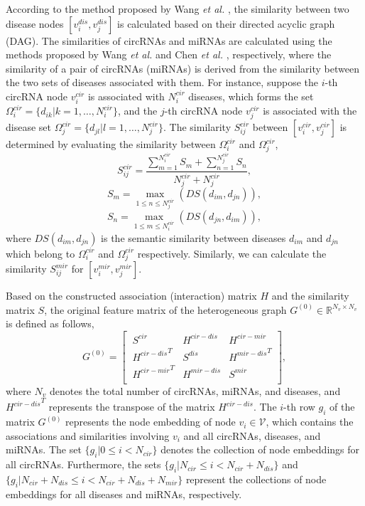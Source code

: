 \documentclass[journal,twoside,web]{ieeecolor}
\begin{document}
According to the method proposed by Wang {\it et al.} \cite{wang2010inferring}, the similarity between two disease nodes $[v_i^{dis},v_j^{dis}]$ is calculated based on their directed acyclic graph (DAG). The similarities of circRNAs and miRNAs are calculated using the methods proposed by Wang {\it et al.} \cite{wang2010inferring} and Chen {\it et al.} \cite{chen2015constructing}, respectively, where the similarity of a pair of circRNAs (miRNAs) is derived from the similarity between the two sets of diseases associated with them. For instance, suppose the $i$-th circRNA node $v_i^{cir}$ is associated with $N^{cir}_i$ diseases, which forms the set $\Omega_i^{cir} = \{d_{ik} | k = 1, \ldots, N^{cir}_i\}$, and the $j$-th circRNA node $v_j^{cir}$ is associated with the disease set $\Omega_j^{cir} = \{d_{jl} | l = 1, \ldots, N^{cir}_j\}$. The similarity $S_{ij}^{cir}$ between $[v_i^{cir},v_j^{cir}]$ is determined by evaluating the similarity between $\Omega_i^{cir}$ and $\Omega_j^{cir}$, 
\begin{equation}
S_{ij}^{cir} = \frac{{\sum_{m=1}^{N^{cir}_i}S_m}+{\sum_{n=1}^{N^{cir}_j}}S_n }{N^{cir}_j + N^{cir}_j},
\end{equation}
\begin{equation}
    S_m = \underset{1\leqslant n\leqslant N^{cir}_j}{\max}(DS(d_{im}, d_{jn})),
\end{equation}
\begin{equation}
    S_n = \underset{1\leqslant m\leqslant N^{cir}_i}{\max}(DS(d_{jn}, d_{im})),
\end{equation}
where $DS(d_{im}, d_{jn})$ is the semantic similarity between diseases $d_{im}$ and $d_{jn}$ which belong to $\Omega_i^{cir}$ and $\Omega_j^{cir}$ respectively. %
Similarly, we can calculate the similarity $S_{ij}^{mir}$ for $[v_i^{mir},v_j^{mir}]$.

Based on the constructed association (interaction) matrix $H$ and the similarity matrix $S$, the original feature matrix of the heterogeneous graph $G^{(0)} \in \mathbb{R}^{N_v\times N_v}$ is defined as follows,
\begin{equation}
G^{(0)} = \left[\ \begin{array}{lll}
S^{cir} & H^{cir-dis} & H^{cir-mir}\\
{H^{cir-dis}}^T & S^{dis} & {H^{mir-dis}}^T\\
{H^{cir-mir}}^T & H^{mir-dis} & S^{mir}\\
\end{array} \right],
\end{equation}
where $N_v$ denotes the total number of circRNAs, miRNAs, and diseases, and ${H^{cir-dis}}^T$ represents the transpose of the matrix $H^{cir-dis}$. The $i$-th row $g_i$ of the matrix $G^{(0)}$ represents the node embedding of node $v_i \in \mathcal{V}$, which contains the associations and similarities involving $v_i$ and all circRNAs, diseases, and miRNAs. The set $\{g_i | 0 \leqslant i < N_{cir}\}$ denotes the collection of node embeddings for all circRNAs. Furthermore, the sets $\{g_i | N_{cir} \leqslant i < N_{cir} + N_{dis}\}$ and $\{g_i | N_{cir} + N_{dis} \leqslant i < N_{cir} + N_{dis} + N_{mir}\}$ represent the collections of node embeddings for all diseases and miRNAs, respectively.
\end{document}
